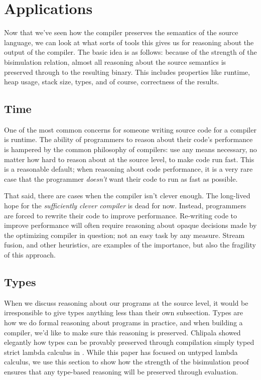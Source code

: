 \section{Applications}

Now that we've seen how the compiler preserves the semantics of the source
language, we can look at what sorts of tools this gives us for reasoning about
the output of the compiler. The basic idea is as follows: because of the
strength of the bisimulation relation, almost all reasoning about the source
semantics is preserved through to the resulting binary. This includes properties
like runtime, heap usage, stack size, types, and of course, correctness of
the results.

\subsection{Time}

One of the most common concerns for someone writing source code for a compiler
is runtime. The ability of programmers to reason about their code's performance
is hampered by the common philosophy of compilers: use any means necessary, no
matter how hard to reason about at the source level, to make code run fast. This
is a reasonable default; when reasoning about code performance, it is a very
rare case that the programmer \emph{doesn't} want their code to run as fast as
possible. 

That said, there are cases when the compiler isn't clever enough. The long-lived
hope for the \emph{sufficiently clever compiler} is dead for now. Instead,
programmers are forced to rewrite their code to improve performance. Re-writing
code to improve performance will often require reasoning about opaque decisions
made by the optimizing compiler in question; not an easy task by any measure.
Stream fusion, and other heuristics, are examples of the importance, but also
the fragility of this approach.

\subsection{Types}

When we discuss reasoning about our programs at the source level, it would be
irresponsible to give types anything less than their own subsection. Types are
how we do formal reasoning about programs in practice, and when building a
compiler, we'd like to make sure this reasoning is preserved. Chlipala showed
elegantly how types can be provably preserved through compilation simply typed
strict lambda calculus in \cite{?}. While this paper has focused on untyped
lambda calculus, we use this section to show how the strength of the
bisimulation proof ensures that any type-based reasoning will be preserved
through evaluation.  

